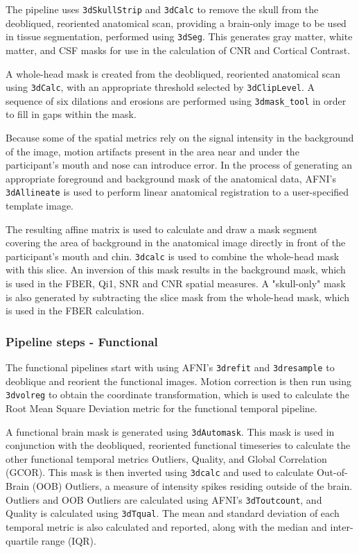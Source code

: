 \documentclass{frontiersSCNS} %
\begin{document}
The pipeline uses \texttt{3dSkullStrip} and \texttt{3dCalc} to remove the skull from the deobliqued, reoriented anatomical scan, providing a brain-only image to be used in tissue segmentation, performed using \texttt{3dSeg}. This generates gray matter, white matter, and CSF masks for use in the calculation of CNR and Cortical Contrast.

A whole-head mask is created from the deobliqued, reoriented anatomical scan using \texttt{3dCalc}, with an appropriate threshold selected by \texttt{3dClipLevel}. A sequence of six dilations and erosions are performed using \texttt{3dmask\_tool} in order to fill in gaps within the mask.

Because some of the spatial metrics rely on the signal intensity in the background of the image, motion artifacts present in the area near and under the participant's mouth and nose can introduce error. In the process of generating an appropriate foreground and background mask of the anatomical data, AFNI's \texttt{3dAllineate} is used to perform linear anatomical registration to a user-specified template image.

The resulting affine matrix is used to calculate and draw a mask segment covering the area of background in the anatomical image directly in front of the participant's mouth and chin. \texttt{3dcalc} is used to combine the whole-head mask with this slice. An inversion of this mask results in the background mask, which is used in the FBER, Qi1, SNR and CNR spatial measures. A "skull-only" mask is also generated by subtracting the slice mask from the whole-head mask, which is used in the FBER calculation.

\subsubsection{Pipeline steps - Functional}
The functional pipelines start with using AFNI's \texttt{3drefit} and \texttt{3dresample} to deoblique and reorient the functional images. Motion correction is then run using \texttt{3dvolreg} to obtain the coordinate transformation, which is used to calculate the Root Mean Square Deviation metric for the functional temporal pipeline. 

A functional brain mask is generated using \texttt{3dAutomask}. This mask is used in conjunction with the deobliqued, reoriented functional timeseries to calculate the other functional temporal metrics Outliers, Quality, and Global Correlation (GCOR). This mask is then inverted using \texttt{3dcalc} and used to calculate Out-of-Brain (OOB) Outliers, a measure of intensity spikes residing outside of the brain. Outliers and OOB Outliers are calculated using AFNI's \texttt{3dToutcount}, and Quality is calculated using \texttt{3dTqual}. The mean and standard deviation of each temporal metric is also calculated and reported, along with the median and inter-quartile range (IQR).
\end{document}
